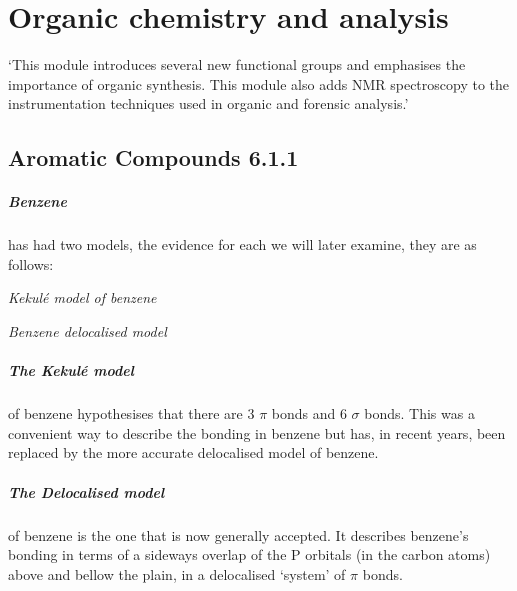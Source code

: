 \chapter{Organic chemistry and analysis}
`This module introduces several new functional groups
and emphasises the importance of organic synthesis.
This module also adds NMR spectroscopy to the instrumentation techniques used in organic and forensic analysis.'

\section{Aromatic Compounds 6.1.1}
	\paragraph{Benzene} has had two models, the evidence for each we will later examine, they are as follows:
	\begin{center}

	\textit{Kekul\'{e} model of benzene}
	
	\vspace{7mm}	
	

	\textit{Benzene delocalised model}
	\end{center}
	
	\paragraph{The Kekul\'{e} model} of benzene hypothesises that there are 3 $\pi$ bonds and 6 $\sigma$ bonds.
	This was a convenient way to describe the bonding in benzene but has, in recent years, been replaced by the more accurate delocalised model of benzene.
	
	\paragraph{The Delocalised model} of benzene is the one that is now generally accepted. 
	It describes benzene's bonding in terms of a sideways overlap of the P orbitals (in the carbon atoms) above and bellow the plain, in a delocalised `system' of $\pi$ bonds.
	
